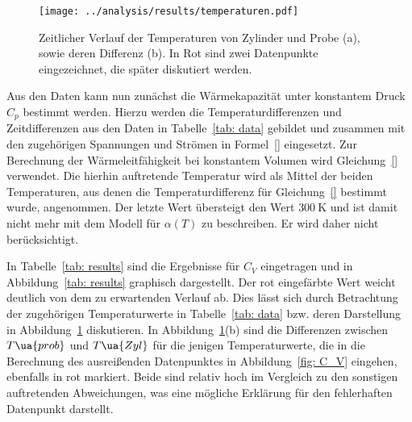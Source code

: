 

\begin{figure}
\centering
\texttt{[image: ../analysis/results/temperaturen.pdf]}
\caption{Zeitlicher Verlauf der Temperaturen von Zylinder und Probe (a), sowie deren Differenz (b). In Rot sind 
        zwei Datenpunkte eingezeichnet, die später diskutiert werden.}
\label{fig: temp}
\end{figure}

Aus den Daten kann nun zunächst die Wärmekapazität unter konstantem Druck $C_p$ bestimmt werden. Hierzu werden 
die Temperaturdifferenzen und Zeitdifferenzen aus den Daten in Tabelle~\ref{tab: data} gebildet und zusammen mit den 
zugehörigen Spannungen und Strömen in Formel~\eqref{} eingesetzt. Zur Berechnung der Wärmeleitfähigkeit 
bei konstantem Volumen wird Gleichung~\eqref{} verwendet. Die hierhin auftretende Temperatur wird als Mittel 
der beiden Temperaturen, aus denen die Temperaturdifferenz für Gleichung~\eqref{} bestimmt wurde, angenommen. 
Der letzte Wert übersteigt den Wert $\SI{300}{\kelvin}$ und ist damit nicht mehr mit dem Modell für $\alpha(T)$
zu beschreiben. Er wird daher nicht berücksichtigt.



In Tabelle~\ref{tab: results} sind die Ergebnisse für $C_V$ eingetragen und in Abbildung~\ref{tab: results} graphisch dargestellt. 
Der rot eingefärbte Wert weicht deutlich von dem zu erwartenden Verlauf ab. Dies lässt sich durch Betrachtung der 
zugehörigen Temperaturwerte in Tabelle~\ref{tab: data} bzw. deren Darstellung in Abbildung~\ref{fig: temp} diskutieren. In Abbildung~\ref{fig: temp}(b)
sind die Differenzen zwischen $T\ua{prob}$ und $T\ua{Zyl}$ für die jenigen Temperaturwerte, die in die Berechnung des 
ausreißenden Datenpunktes in Abbildung~\ref{fig: C_V} eingehen, ebenfalls in rot markiert. Beide sind relativ hoch im Vergleich zu den 
sonstigen auftretenden Abweichungen, was eine mögliche Erklärung für den fehlerhaften Datenpunkt darstellt.  

